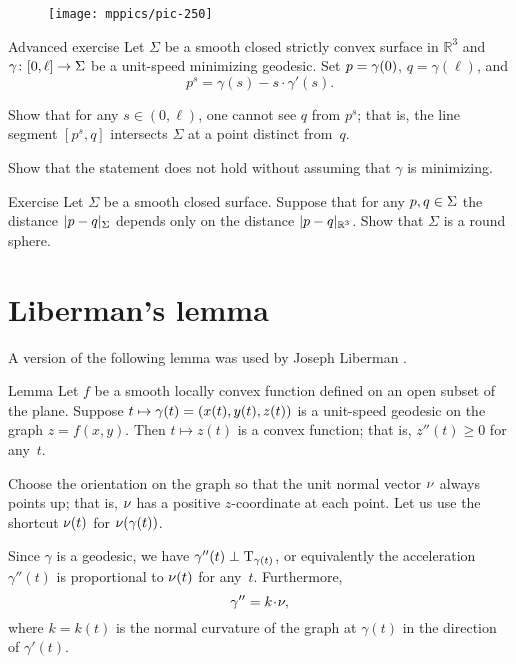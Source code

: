 {

\begin{wrapfigure}{r}{40 mm}
\vskip-8mm
\centering
\texttt{[image: mppics/pic-250]}
\vskip-0mm
\end{wrapfigure}

\begin{thm}{Advanced exercise}\label{ex:milka}
Let $\Sigma$ be a smooth closed strictly convex surface 
in $\mathbb{R}^3$ 
and $\gamma\:[0,\ell]\z\to \Sigma$ be a unit-speed minimizing geodesic.
Set $p\z=\gamma(0)$, $q=\gamma(\ell)$, and 
\[p^s=\gamma(s)-s\cdot\gamma'(s).\] 


Show that for any $s\in (0,\ell)$,
one cannot see $q$ from $p^s$;
that is, the line segment $[p^s,q]$ intersects $\Sigma$ at a point distinct from~$q$.

Show that the statement does not hold without assuming that $\gamma$ is minimizing.
\end{thm}

}

\begin{thm}{Exercise}\label{ex:round-sphere}
Let $\Sigma$ be a smooth closed surface.
Suppose that for any $p,q\z\in \Sigma$ the distance $\dist{p}{q}\Sigma$ depends only on the distance $\dist{p}{q}{\mathbb{R}^3}$.
Show that $\Sigma$ is a round sphere.
\end{thm}



\section{Liberman's lemma}

A version of the following lemma was used by Joseph Liberman \cite{liberman}.

\begin{thm}{Lemma}
\label{lem:liberman}
Let $f$ be a smooth locally convex function defined on an open subset of the plane.
Suppose $t\mapsto \gamma(t)\z=(x(t),y(t),z(t))$ is a unit-speed geodesic on the graph $z=f(x,y)$.
Then $t\mapsto z(t)$ is a convex function; that is, $z''(t)\ge 0$ for any~$t$.
\end{thm}

Choose the orientation on the graph so that the unit normal vector $\nu$ always points up;
that is, $\nu$ has a positive $z$-coordinate at each point.
Let us use the shortcut $\nu(t)$ for $\nu(\gamma(t))$.

Since $\gamma$ is a geodesic, we have $\gamma''(t)\perp\mathrm{T}_{\gamma(t)}$,
or equivalently the acceleration $\gamma''(t)$ is proportional to $\nu(t)$ for any~$t$.
Furthermore,
\[\gamma''=k\cdot\Norm,\]
where $k=k(t)$ is the normal curvature of the graph at $\gamma(t)$ in the direction of $\gamma'(t)$.

